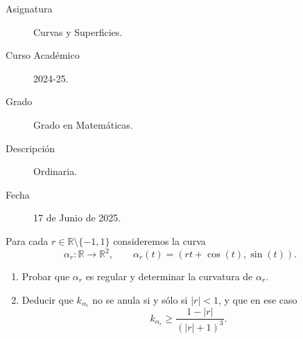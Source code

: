 \documentclass[12pt]{article}
\begin{document}

    
    

    \begin{description}
        \item[Asignatura] Curvas y Superficies.
        \item[Curso Académico] 2024-25.
        \item[Grado] Grado en Matemáticas.
        \item[Descripción] Ordinaria.
        \item[Fecha] 17 de Junio de 2025.  
    \end{description}
    \newpage



    \begin{ejercicio}
        Para cada $r \in \mathbb{R}\setminus\{-1,1\}$ consideremos la curva
        $$
        \alpha_r : \mathbb{R}\longrightarrow \mathbb{R}^2,\qquad
        \alpha_r(t) = (rt+\cos(t),\sin(t)).
        $$

        \begin{enumerate}
            \item[a)] Probar que $\alpha_r$ es regular y determinar la curvatura de $\alpha_r$.

            \item[b)] Deducir que $k_{\alpha_r}$ no se anula si y sólo si $|r|<1$, y que en ese caso
            $$
            k_{\alpha_r}\geq \frac{1-|r|}{(|r|+1)^3}.
            $$
        \end{enumerate}
    \end{ejercicio}
\end{document}

